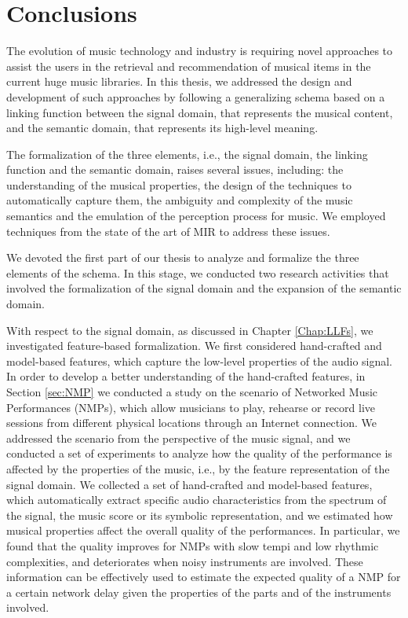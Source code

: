 \chapter{Conclusions}
\label{Chap:Concl}
The evolution of music technology and industry is requiring novel approaches to assist the users in the retrieval and recommendation of musical items in the current huge music libraries. In this thesis, we addressed the design and development of such approaches by following a generalizing schema based on a linking function between the signal domain, that represents the musical content, and the semantic domain, that represents its high-level meaning. 

The formalization of the three elements, i.e., the signal domain, the linking function and the semantic domain, raises several issues, including: the understanding of the musical properties, the design of the techniques to automatically capture them, the ambiguity and complexity of the music semantics and the emulation of the perception process for music. We employed techniques from the state of the art of MIR to address these issues.

We devoted the first part of our thesis to analyze and formalize the three elements of the schema. In this stage, we conducted two research activities that involved the formalization of the signal domain and the expansion of the semantic domain.

With respect to the signal domain, as discussed in Chapter \ref{Chap:LLFs}, we investigated feature-based formalization. We first considered hand-crafted and model-based features, which capture the low-level properties of the audio signal. In order to develop a better understanding of the hand-crafted features, in Section \ref{sec:NMP} we conducted a study on the scenario of Networked Music Performances (NMPs), which allow musicians to play, rehearse or record live sessions from different physical locations through an Internet connection. 
We addressed the scenario from the perspective of the music signal, and we conducted a set of experiments to analyze how the quality of the performance is affected by the properties of the music, 
i.e., by the feature representation of the signal domain. We collected a set of hand-crafted and model-based features, which automatically extract specific audio characteristics from the spectrum of the signal, the music score or its symbolic representation, and we estimated how musical properties affect the overall quality of the performances. In particular, we found that the quality improves for NMPs with slow tempi and low rhythmic complexities, and deteriorates when noisy instruments are involved. These information can be effectively used to estimate the expected quality of a NMP for a certain network delay given the properties of the parts and of the instruments involved.

